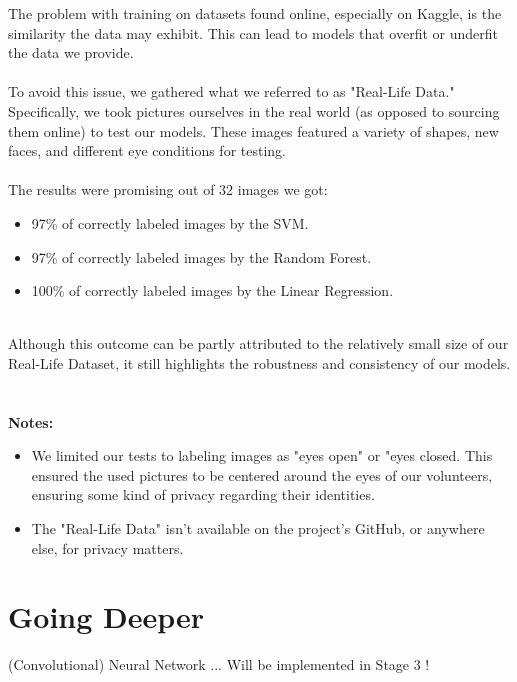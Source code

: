 \documentclass{modeleRapport}
\begin{document}
The problem with training on datasets found online, especially on Kaggle, is the similarity the data may exhibit. This can lead to models that overfit or underfit the data we provide.\\\\
To avoid this issue, we gathered what we referred to as "Real-Life Data." Specifically, we took pictures ourselves in the real world (as opposed to sourcing them online) to test our models. These images featured a variety of shapes, new faces, and different eye conditions for testing.
\\\\

The results were promising out of 32 images we got:
\begin{itemize}
    \item 97\% of correctly labeled images by the SVM.
    \item 97\% of correctly labeled images by the Random Forest.
    \item 100\% of correctly labeled images by the Linear Regression.\\\\
\end{itemize}

Although this outcome can be partly attributed to the relatively small size of our Real-Life Dataset, it still highlights the robustness and consistency of our models.
\\\\\\
\textbf{Notes:}
\begin{itemize}
    \item We limited our tests to labeling images as "eyes open" or "eyes closed. This ensured the used pictures to be centered around the eyes of our volunteers, ensuring some kind of privacy regarding their identities.
    \item The "Real-Life Data" isn't available on the project's GitHub, or anywhere else, for privacy matters.
\end{itemize} 


\newpage

\section{Going Deeper}

(Convolutional) Neural Network ... Will be implemented in Stage 3 !


\insererbiblio
\end{document}
